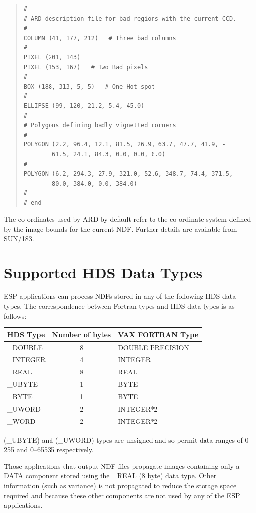 \documentclass[twoside,11pt]{article}
\newcommand{\xref}[3]{#1}
\newenvironment{myquote}{\begin{quote}\begin{small}}{\end{small}\end{quote}}
\begin{document}
\begin{myquote}
\begin{verbatim}
#
# ARD description file for bad regions with the current CCD.
#
COLUMN (41, 177, 212)   # Three bad columns
#
PIXEL (201, 143)  
PIXEL (153, 167)   # Two Bad pixels
#
BOX (188, 313, 5, 5)   # One Hot spot
#
ELLIPSE (99, 120, 21.2, 5.4, 45.0)
#
# Polygons defining badly vignetted corners
#
POLYGON (2.2, 96.4, 12.1, 81.5, 26.9, 63.7, 47.7, 41.9, -
        61.5, 24.1, 84.3, 0.0, 0.0, 0.0)
#
POLYGON (6.2, 294.3, 27.9, 321.0, 52.6, 348.7, 74.4, 371.5, -
        80.0, 384.0, 0.0, 384.0)
#
# end
\end{verbatim}
\end{myquote}

The co-ordinates used by ARD by default refer to the co-ordinate system
defined by the image bounds for the current NDF. Further details are available from 
\xref{SUN/183}{sun183}{}.

\newpage
\section{Supported HDS Data Types}
ESP applications can process NDFs stored in any of the 
following HDS data types.
The correspondence between Fortran types and HDS data types is as follows:

\begin{center}
\begin{tabular}{|l|c|l|} \hline
{\bf HDS Type} & {\bf Number of bytes} & {\bf VAX FORTRAN Type}\\ \hline
\_DOUBLE & 8 & DOUBLE PRECISION \\
\_INTEGER & 4 & INTEGER \\
\_REAL & 8 & REAL \\
\_UBYTE & 1 & BYTE \\
\_BYTE & 1 & BYTE \\
\_UWORD & 2 & INTEGER*2 \\
\_WORD & 2 & INTEGER*2\\
\hline
\end{tabular}
\end{center}

(\_UBYTE) and (\_UWORD) types are unsigned and so permit data ranges of
0--255 and 0--65535 respectively.

Those applications that output NDF files propagate images containing only
a DATA component stored using the \_REAL (8 byte) data type. Other information
(such as variance) is not propagated to reduce the storage space required and
because these other components are not used by any of the ESP applications.
\end{document}
